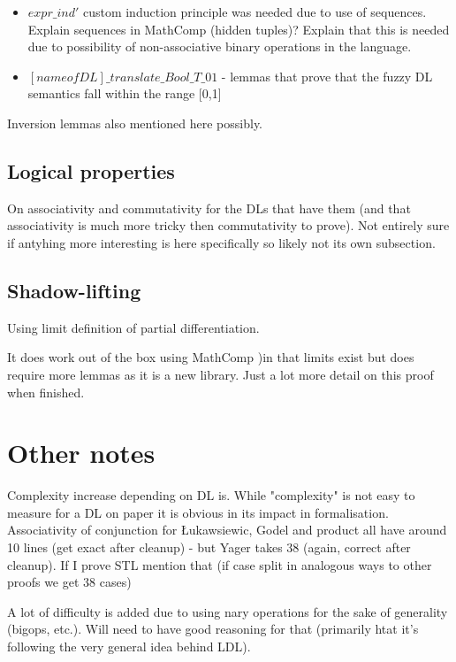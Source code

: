 \documentclass[]{article}
\begin{document}
\begin{itemize}
	\item $expr\_ind'$ custom induction principle was needed due to use of sequences. Explain sequences in MathComp (hidden tuples)? Explain that this is needed due to possibility of non-associative binary operations in the language.
	\item $[name of DL]\_translate\_Bool\_T\_01$ - lemmas that prove that the fuzzy DL semantics fall within the range [0,1]
\end{itemize}

Inversion lemmas also mentioned here possibly.

\subsection{Logical properties}

On associativity and commutativity for the DLs that have them (and that associativity is much more tricky then commutativity to prove). Not entirely sure if antyhing more interesting is here specifically so likely not its own subsection.

\subsection{Shadow-lifting}

Using limit definition of partial differentiation.

It does work out of the box using MathComp )in that limits exist but does require more lemmas as it is a new library.
Just a lot more detail on this proof when finished.


\section{Other notes}

Complexity increase depending on DL is. While "complexity" is not easy to measure for a DL on paper it is obvious in its impact in formalisation. Associativity of conjunction for Łukawsiewic, Godel and product all have around 10 lines (get exact after cleanup) - but Yager takes 38 (again, correct after cleanup). If I prove STL mention that (if case split in analogous ways to other proofs we get 38 cases)

A lot of difficulty is added due to using nary operations for the sake of generality (bigops, etc.). Will need to have good reasoning for that (primarily htat it's following the very general idea behind LDL).



\end{document}
